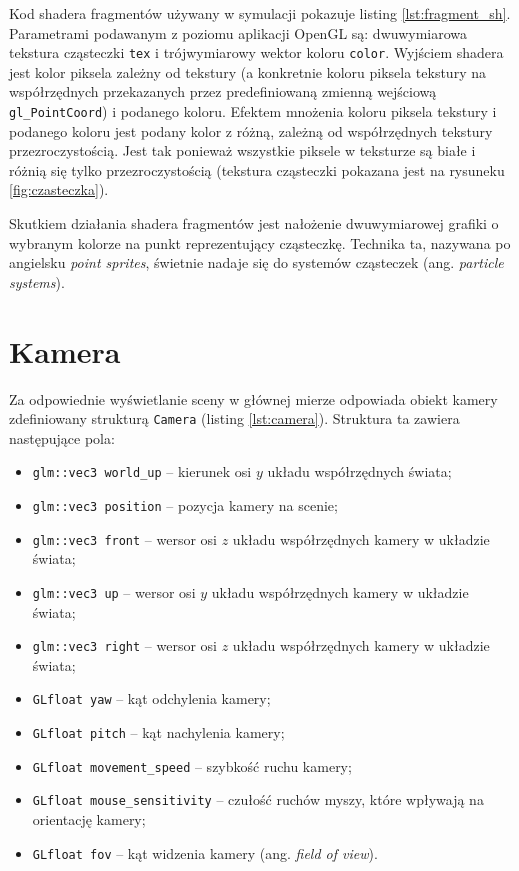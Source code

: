 \documentclass[12pt, twoside, openany]{report}
\begin{document}


Kod shadera fragmentów używany w symulacji pokazuje listing \ref{lst:fragment_sh}. Parametrami podawanym z poziomu aplikacji OpenGL są: dwuwymiarowa tekstura cząsteczki \texttt{tex} i trójwymiarowy wektor koloru \texttt{color}. Wyjściem shadera jest kolor piksela zależny od tekstury (a konkretnie koloru piksela tekstury na współrzędnych przekazanych przez predefiniowaną zmienną wejściową \texttt{gl\_PointCoord})  i podanego koloru. Efektem mnożenia koloru piksela tekstury i podanego koloru jest podany kolor z różną, zależną od współrzędnych tekstury przezroczystością. Jest tak ponieważ wszystkie piksele w teksturze są białe i różnią się tylko przezroczystością (tekstura cząsteczki pokazana jest na rysuneku \ref{fig:czasteczka}).

Skutkiem działania shadera fragmentów jest nałożenie dwuwymiarowej grafiki o wybranym kolorze na punkt reprezentujący cząsteczkę. Technika ta, nazywana po angielsku \textit{point sprites}, świetnie nadaje się do systemów cząsteczek (ang. \textit{particle systems}).



\section{Kamera}


Za odpowiednie wyświetlanie sceny w głównej mierze odpowiada obiekt kamery zdefiniowany strukturą \texttt{Camera} (listing \ref{lst:camera}). Struktura ta zawiera następujące pola:
\begin{itemize}
\item \texttt{glm::vec3 world\_up} -- kierunek osi $y$ układu współrzędnych świata;
\item \texttt{glm::vec3 position} -- pozycja kamery na scenie;
\item \texttt{glm::vec3 front} -- wersor osi $z$ układu współrzędnych kamery w układzie świata;
\item \texttt{glm::vec3 up} -- wersor osi $y$ układu współrzędnych kamery w układzie świata;
\item \texttt{glm::vec3 right} -- wersor osi $z$ układu współrzędnych kamery w układzie świata;
\item \texttt{GLfloat yaw} -- kąt odchylenia kamery;
\item \texttt{GLfloat pitch} -- kąt nachylenia kamery;
\item \texttt{GLfloat movement\_speed} -- szybkość ruchu kamery;
\item \texttt{GLfloat mouse\_sensitivity} -- czułość ruchów myszy, które wpływają na orientację kamery;
\item \texttt{GLfloat fov} -- kąt widzenia kamery (ang. \textit{field of view}).
\end{itemize}
\end{document}
